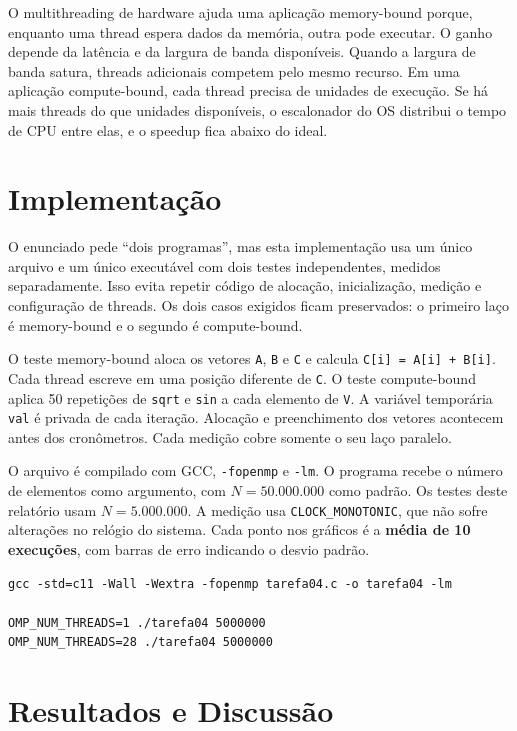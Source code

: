 \documentclass[11pt,letterpaper]{article}
\begin{document}
O multithreading de hardware ajuda uma aplicação memory-bound porque, enquanto uma thread espera dados da memória, outra pode executar. O ganho depende da latência e da largura de banda disponíveis. Quando a largura de banda satura, threads adicionais competem pelo mesmo recurso. Em uma aplicação compute-bound, cada thread precisa de unidades de execução. Se há mais threads do que unidades disponíveis, o escalonador do OS distribui o tempo de CPU entre elas, e o speedup fica abaixo do ideal.

\section{Implementação}
O enunciado pede ``dois programas'', mas esta implementação usa um único arquivo e um único executável com dois testes independentes, medidos separadamente. Isso evita repetir código de alocação, inicialização, medição e configuração de threads. Os dois casos exigidos ficam preservados: o primeiro laço é memory-bound e o segundo é compute-bound.

O teste memory-bound aloca os vetores \texttt{A}, \texttt{B} e \texttt{C} e calcula \texttt{C[i] = A[i] + B[i]}. Cada thread escreve em uma posição diferente de \texttt{C}. O teste compute-bound aplica 50 repetições de \texttt{sqrt} e \texttt{sin} a cada elemento de \texttt{V}. A variável temporária \texttt{val} é privada de cada iteração. Alocação e preenchimento dos vetores acontecem antes dos cronômetros. Cada medição cobre somente o seu laço paralelo.


O arquivo é compilado com GCC, \texttt{-fopenmp} e \texttt{-lm}. O programa recebe o número de elementos como argumento, com $N=50.000.000$ como padrão. Os testes deste relatório usam $N=5.000.000$. A medição usa \texttt{CLOCK\_MONOTONIC}, que não sofre alterações no relógio do sistema. Cada ponto nos gráficos é a \textbf{média de 10 execuções}, com barras de erro indicando o desvio padrão.

\begin{lstlisting}[caption={Compilação e execução dos testes}]
gcc -std=c11 -Wall -Wextra -fopenmp tarefa04.c -o tarefa04 -lm

OMP_NUM_THREADS=1 ./tarefa04 5000000
OMP_NUM_THREADS=28 ./tarefa04 5000000
\end{lstlisting}

\newpage
\section{Resultados e Discussão}
\end{document}
